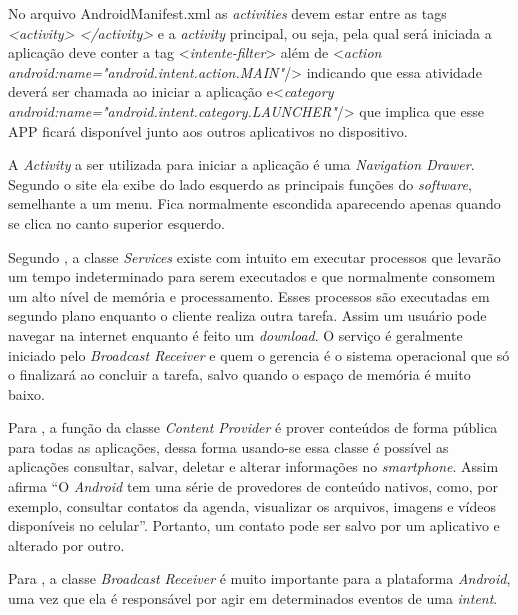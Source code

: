 	\par No arquivo AndroidManifest.xml as \textit{activities} devem estar entre as
tags \textit{<activity> </activity>} e a \textit{activity} principal, ou seja,
pela qual será iniciada a aplicação deve conter a tag <\textit{intente-filter}>
além de <\textit{action android:name="android.intent.action.MAIN"}/> indicando
que essa atividade deverá ser chamada ao iniciar a aplicação e\linebreak[4]
<\textit{category android:name="android.intent.category.LAUNCHER"}/> que
implica que esse APP ficará disponível junto aos outros aplicativos no
dispositivo.

	\par A \textit{Activity} a ser utilizada para iniciar a aplicação é uma
\textit{Navigation Drawer}. Segundo o site  ela exibe
do lado esquerdo as principais funções do \textit{software}, semelhante a um
menu. Fica normalmente escondida aparecendo apenas quando se clica no canto
superior esquerdo.

	\par Segundo , a classe \textit{Services} existe
com intuito em executar processos que levarão um tempo indeterminado para serem
executados e que normalmente consomem um alto nível de memória e processamento.
Esses processos são executadas em segundo plano enquanto o cliente realiza
outra tarefa. Assim um usuário pode navegar na internet enquanto é feito um
\textit{download}. O serviço é geralmente iniciado pelo \textit{Broadcast
Receiver} e quem o gerencia é o sistema operacional que só o finalizará ao
concluir a tarefa, salvo quando o espaço de memória é muito baixo.

	\par Para , a função da classe \textit{Content
Provider} é prover conteúdos de forma pública para todas as aplicações, dessa
forma usando-se essa classe é possível as aplicações consultar, salvar, deletar
e alterar informações no \textit{smartphone}. Assim afirma
 “O \textit{Android} tem uma série de provedores
de conteúdo nativos, como, por exemplo, consultar contatos da agenda,
visualizar os arquivos, imagens e vídeos disponíveis no celular”. Portanto, um
contato pode ser salvo por um aplicativo e alterado por outro.

	\par Para , a classe \textit{Broadcast Receiver}
é muito importante para a plataforma \textit{Android}, uma vez que ela é
responsável por agir em determinados eventos de uma \textit{intent}.

